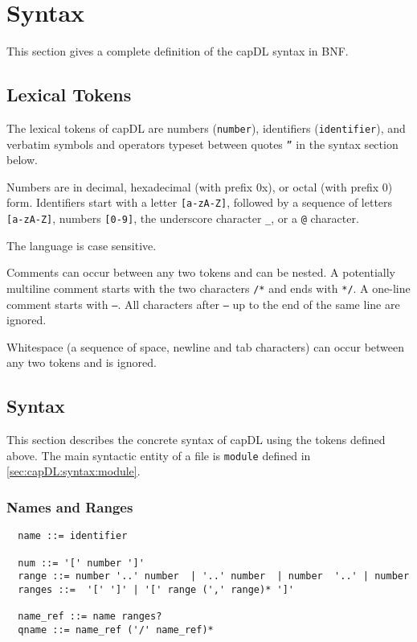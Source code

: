 \documentclass[a4paper,11pt]{article}
\begin{document}
\section{Syntax}
\label{sec:capDL:syntax}

This section gives a complete definition of the capDL syntax in BNF.

\subsection{Lexical Tokens}

The lexical tokens of capDL are numbers (\texttt{number}), identifiers
(\texttt{identifier}), and verbatim symbols and operators typeset between
quotes \texttt{''} in the syntax section below.

Numbers are in decimal, hexadecimal (with prefix 0x), or octal (with prefix 0)
form. Identifiers start with a letter \texttt{[a-zA-Z]}, followed by a
sequence of letters \texttt{[a-zA-Z]}, numbers \texttt{[0-9]}, the
underscore character \texttt{\_}, or a \texttt{@} character.

The language is case sensitive.

Comments can occur between any two tokens and can be nested. A potentially
multiline comment starts with the two characters \texttt{/*} and ends with
\texttt{*/}. A one-line comment starts with \texttt{--}. All characters after
\texttt{--} up to the end of the same line are ignored.

Whitespace (a sequence of space, newline and tab characters) can occur between
any two tokens and is ignored.


\subsection{Syntax}

This section describes the concrete syntax of capDL using the tokens defined above. The main syntactic entity of a file is \texttt{module} defined in \ref{sec:capDL:syntax:module}.

\subsubsection{Names and Ranges}

\begin{verbatim}
  name ::= identifier

  num ::= '[' number ']'
  range ::= number '..' number  | '..' number  | number  '..' | number            
  ranges ::=  '[' ']' | '[' range (',' range)* ']' 

  name_ref ::= name ranges?
  qname ::= name_ref ('/' name_ref)* 
\end{verbatim}
\end{document}
